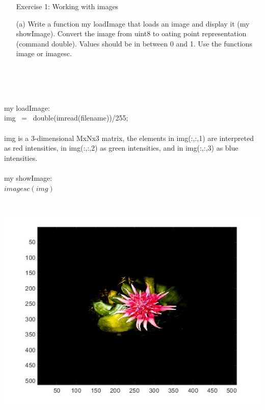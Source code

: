 



\graphicspath{ {images/} }

 
    \begin{enumerate}
         \item[Exercise 1:] Working with images
    \end{enumerate}
    \begin{enumerate}
        \item[(a)] {Write a function my loadImage that loads an image and display it (my showImage). Convert the image from uint8 to oating point representation (command double). Values should be in between 0 and 1. Use the functions image or imagesc.}
    \end{enumerate}
        \\ \ \\
        \\ \raggedright{ my loadImage:
        \\  img \ = \ double(imread(filename))/255;
        \\ \ \\ img is a 3-dimensional MxNx3 matrix, the elements in img(:,:,1) are interpreted as red  intensities, in img(:,:,2) as green intensities, and in img(:,:,3) as blue intensities.
        \\ \ \\ my showImage:
        \\ $ imagesc(img) $ }
        \\ \ \\ \ \\
    	\centering
        \includegraphics[scale=0.7]{images/SolutionFirstPart.jpg} 
